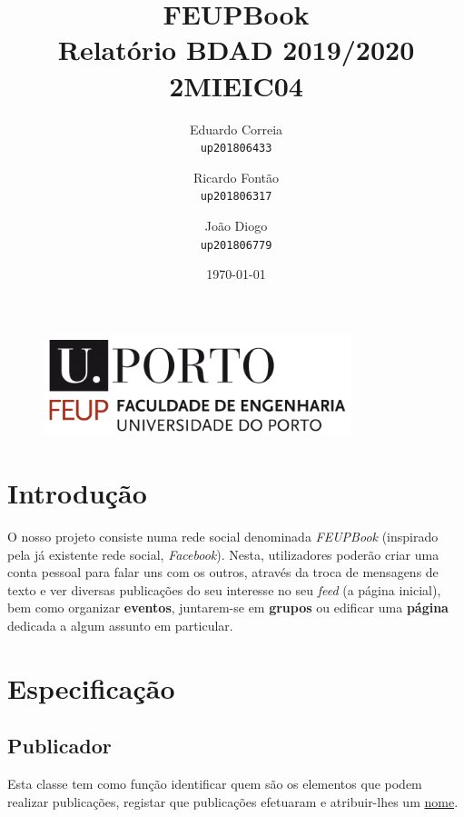 \documentclass[12pt]{report}
\begin{document}
\title{\Huge{\textbf{FEUPBook}} \\ Relatório BDAD 2019/2020 \\ \Large{2MIEIC04}}
\author{Eduardo Correia \\ \texttt{up201806433} \and
	    Ricardo Fontão \\  \texttt{up201806317} \and
        João Diogo \\ \texttt{up201806779}}
\date{\today}

\begin{figure}[b] %
    \centering
    \includegraphics[width=0.8\textwidth]{feup-logo}
\end{figure}

\maketitle

\tableofcontents

\chapter{Introdução}

O nosso projeto consiste numa rede social denominada \textit{FEUPBook} (inspirado pela já existente rede social,  \textit{Facebook}). Nesta, utilizadores poderão criar uma conta pessoal para falar uns com os outros, através da troca de mensagens de texto e ver diversas publicações do seu interesse no seu \textit{feed} (a página inicial), bem como organizar \textbf{eventos}, juntarem-se em \textbf{grupos} ou edificar uma \textbf{página} dedicada a algum assunto em particular.

\chapter{Especificação} 

\section{Publicador}

Esta classe tem como função identificar quem são os elementos que podem realizar publicações, registar que publicações efetuaram e atribuir-lhes um \underline{nome}.
\end{document}
